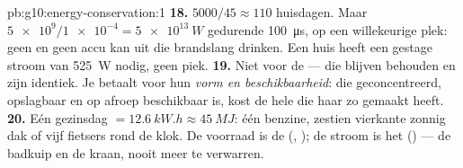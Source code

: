 \begin{solution}{pb:g10:energy-conservation:1}
\textbf{18.} $5000/45 \approx 110$ huisdagen. Maar
$\num{5e9}/\num{1e-4} = \qty{5e13}{W}$ gedurende \qty{100}{\micro s}, op
een willekeurige plek: geen  en geen accu kan uit die brandslang
drinken. Een huis heeft een gestage stroom van \qty{525}{W} nodig, geen
piek.
\textbf{19.} Niet voor de  --- die blijven behouden en zijn
identiek. Je betaalt voor hun \emph{vorm en beschikbaarheid}:  die
geconcentreerd, opslagbaar en op afroep beschikbaar is, kost de hele
 die haar zo gemaakt heeft.
\textbf{20.} Eén gezinsdag $= \qty{12.6}{kW.h} \approx \qty{45}{MJ}$:
één  benzine, zestien vierkante  zonnig dak of vijf
fietsers rond de klok. De voorraad is de  (, );
de stroom is het  () --- de badkuip en de kraan, nooit meer
te verwarren.
\end{solution}
